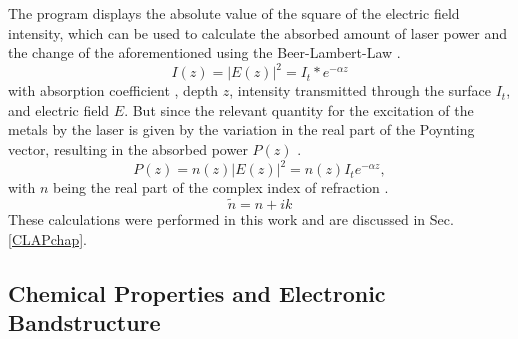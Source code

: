 \documentclass[a4paper,12pt,twoside]{article}
\begin{document}
    The program displays the absolute value of the square of the electric field intensity, which can be used to calculate the absorbed amount of laser power and the change of the aforementioned using the Beer-Lambert-Law \cite{Eschenlohr2014}.
    \begin{equation}
        \label{Beerlambertlaw}
          I(z)=\left\lvert E(z) \right\rvert^{ 2 } =I_{ t } * e^{ -\alpha z }
    \end{equation}
with absorption coefficient \textalpha, depth $z$, intensity transmitted through the surface $I_{t}$, and electric field $E$. But since the relevant quantity for the excitation of the metals by the laser is given by the variation in the real part of the Poynting vector, resulting in the absorbed power $P(z)$ \cite{Eschenlohr2014}.
    \begin{equation}
        \label{beerlambertintegrated}
        P(z)=n(z)\left\lvert E(z) \right\rvert^{ 2 } =n(z)I_{ t } e^{ -\alpha z },
    \end{equation}
with $n$ being the real part of the complex index of refraction \cite{Eschenlohr2014}.
    \begin{equation}
        \label{complexrefractiveindexagain}
        \tilde{n} = n + ik
    \end{equation}
    \noindent
    These calculations were performed in this work and are discussed in Sec.\,\ref{CLAPchap}.

    
        
        \subsection{Chemical Properties and Electronic Bandstructure}
            \label{CPEBchap}
\end{document}

